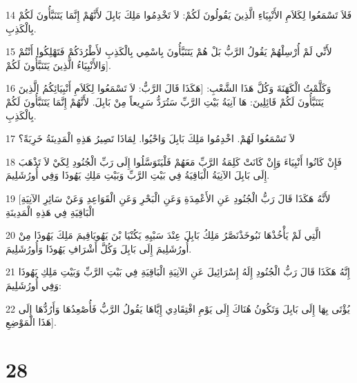 \par 14 فَلاَ تَسْمَعُوا لِكَلاَمِ الأَنْبِيَاءِ الَّذِينَ يَقُولُونَ لَكُمْ: لاَ تَخْدِمُوا مَلِكَ بَابِلَ لأَنَّهُمْ إِنَّمَا يَتَنَبَّأُونَ لَكُمْ بِالْكَذِبِ.
\par 15 لأَنِّي لَمْ أُرْسِلْهُمْ يَقُولُ الرَّبُّ بَلْ هُمْ يَتَنَبَّأُونَ بِاسْمِي بِالْكَذِبِ لأَطْرُدَكُمْ فَتَهْلِكُوا أَنْتُمْ وَالأَنْبِيَاءُ الَّذِينَ يَتَنَبَّأُونَ لَكُمْ].
\par 16 وَكَلَّمْتُ الْكَهَنَةَ وَكُلَّ هَذَا الشَّعْبِ: [هَكَذَا قَالَ الرَّبُّ: لاَ تَسْمَعُوا لِكَلاَمِ أَنْبِيَائِكُمُ الَّذِينَ يَتَنَبَّأُونَ لَكُمْ قَائِلِينَ: هَا آنِيَةُ بَيْتِ الرَّبِّ سَتُرَدُّ سَرِيعاً مِنْ بَابِلَ. لأَنَّهُمْ إِنَّمَا يَتَنَبَّأُونَ لَكُمْ بِالْكَذِبِ.
\par 17 لاَ تَسْمَعُوا لَهُمْ. اخْدِمُوا مَلِكَ بَابِلَ وَاحْيُوا. لِمَاذَا تَصِيرُ هَذِهِ الْمَدِينَةُ خَرِبَةً؟
\par 18 فَإِنْ كَانُوا أَنْبِيَاءَ وَإِنْ كَانَتْ كَلِمَةُ الرَّبِّ مَعَهُمْ فَلْيَتَوَسَّلُوا إِلَى رَبِّ الْجُنُودِ لِكَيْ لاَ تَذْهَبَ إِلَى بَابِلَ الآنِيَةُ الْبَاقِيَةُ فِي بَيْتِ الرَّبِّ وَبَيْتِ مَلِكِ يَهُوذَا وَفِي أُورُشَلِيمَ.
\par 19 [لأَنَّهُ هَكَذَا قَالَ رَبُّ الْجُنُودِ عَنِ الأَعْمِدَةِ وَعَنِ الْبَحْرِ وَعَنِ الْقَوَاعِدِ وَعَنْ سَائِرِ الآنِيَةِ الْبَاقِيَةِ فِي هَذِهِ الْمَدِينَةِ
\par 20 الَّتِي لَمْ يَأْخُذْهَا نَبُوخَذْنَصَّرُ مَلِكُ بَابِلَ عِنْدَ سَبْيِهِ يَكُنْيَا بْنَ يَهُويَاقِيمَ مَلِكَ يَهُوذَا مِنْ أُورُشَلِيمَ إِلَى بَابِلَ وَكُلَّ أَشْرَافِ يَهُوذَا وَأُورُشَلِيمَ.
\par 21 إِنَّهُ هَكَذَا قَالَ رَبُّ الْجُنُودِ إِلَهُ إِسْرَائِيلَ عَنِ الآنِيَةِ الْبَاقِيَةِ فِي بَيْتِ الرَّبِّ وَبَيْتِ مَلِكِ يَهُوذَا وَفِي أُورُشَلِيمَ:
\par 22 يُؤْتَى بِهَا إِلَى بَابِلَ وَتَكُونُ هُنَاكَ إِلَى يَوْمِ افْتِقَادِي إِيَّاهَا يَقُولُ الرَّبُّ فَأُصْعِدُهَا وَأَرُدُّهَا إِلَى هَذَا الْمَوْضِعِ].

\chapter{28}

